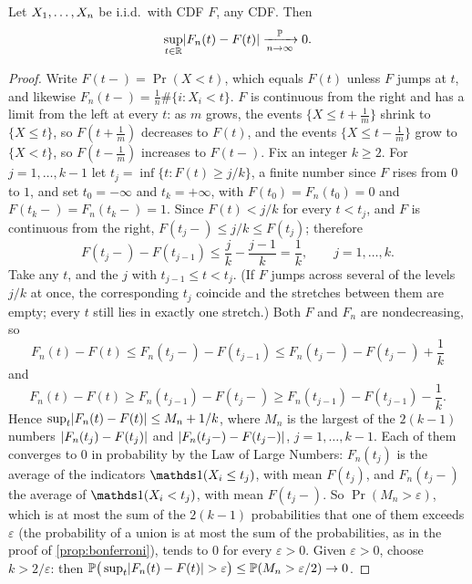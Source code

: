 
\begin{theorem}
\label{thm:glivenko-cantelli}
Let $X_1, \ldots, X_n$ be i.i.d.\ with CDF $F$, any CDF. Then
\[
\sup_{t \in \mathbb{R}}\lvert F_n(t) - F(t)\rvert \xrightarrow [n \to \infty ]{\mathbb{P}} 0.
\]
\end{theorem}

\begin{proof}
Write $F(t-) = \Pr(X < t)$, which equals $F(t)$ unless $F$ jumps at $t$, and likewise $F_n(t-) = \frac1n\#\{i : X_i < t\}$.
$F$ is continuous from the right and has a limit from the left at every $t$: as $m$ grows, the events $\{X \leq t + \frac1m\}$ shrink to $\{X \leq t\}$, so $F(t + \frac1m)$ decreases to $F(t)$, and the events $\{X \leq t - \frac1m\}$ grow to $\{X < t\}$, so $F(t - \frac1m)$ increases to $F(t-)$.
Fix an integer $k \geq 2$.
For $j = 1, \ldots, k - 1$ let $t_j = \inf\{t : F(t) \geq j/k\}$, a finite number since $F$ rises from $0$ to $1$, and set $t_0 = -\infty$ and $t_k = +\infty$, with $F(t_0) = F_n(t_0) = 0$ and $F(t_k-) = F_n(t_k-) = 1$.
Since $F(t) < j/k$ for every $t < t_j$, and $F$ is continuous from the right, $F(t_j-) \leq j/k \leq F(t_j)$; therefore
\[
F(t_j-) - F(t_{j-1}) \leq \frac{j}{k} - \frac{j - 1}{k} = \frac1k, \qquad j = 1, \ldots, k.
\]
Take any $t$, and the $j$ with $t_{j-1} \leq t < t_j$.
(If $F$ jumps across several of the levels $j/k$ at once, the corresponding $t_j$ coincide and the stretches between them are empty; every $t$ still lies in exactly one stretch.)
Both $F$ and $F_n$ are nondecreasing, so
\[
F_n(t) - F(t) \leq F_n(t_j-) - F(t_{j-1}) \leq F_n(t_j-) - F(t_j-) + \frac1k
\]
and
\[
F_n(t) - F(t) \geq F_n(t_{j-1}) - F(t_j-) \geq F_n(t_{j-1}) - F(t_{j-1}) - \frac1k.
\]
Hence $\sup_t\lvert F_n(t) - F(t)\rvert \leq M_n + 1/k$, where $M_n$ is the largest of the $2(k - 1)$ numbers $\lvert F_n(t_j) - F(t_j)\rvert$ and $\lvert F_n(t_j-) - F(t_j-)\rvert$, $j = 1, \ldots, k - 1$.
Each of them converges to $0$ in probability by the Law of Large Numbers: $F_n(t_j)$ is the average of the indicators $\ind(X_i \leq t_j)$, with mean $F(t_j)$, and $F_n(t_j-)$ the average of $\ind(X_i < t_j)$, with mean $F(t_j-)$.
So $\Pr(M_n > \varepsilon)$, which is at most the sum of the $2(k - 1)$ probabilities that one of them exceeds $\varepsilon$ (the probability of a union is at most the sum of the probabilities, as in the proof of \cref{prop:bonferroni}), tends to $0$ for every $\varepsilon > 0$.
Given $\varepsilon > 0$, choose $k > 2/\varepsilon$: then $\mathbb{P}\big(\sup_t\lvert F_n(t) - F(t)\rvert > \varepsilon\big) \leq \mathbb{P}(M_n > \varepsilon/2) \to 0$.
\end{proof}

